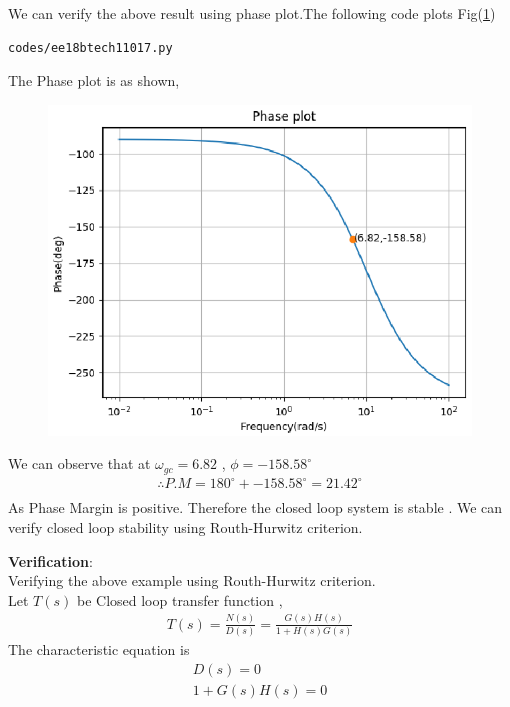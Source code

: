 \begin{enumerate}[label=\thesection.\arabic*.,ref=\thesection.\theenumi]
We can verify the above result using phase plot.The following code plots Fig(\ref{fig:ee18btech11017_2})
\begin{lstlisting}
codes/ee18btech11017.py
\end{lstlisting}
The Phase plot is as shown,
\begin{figure}[!h]
  \includegraphics[width=\columnwidth]{./figures/ee18btech11017_2.eps}
  \caption{}
  \label{fig:ee18btech11017_2}
\end{figure}

We can observe that at $\omega_{gc}=6.82$ , $\phi=-158.58^{\circ}$
\\
\begin{align}
\therefore P.M=180^{\circ}+-158.58^{\circ}=21.42^{\circ} \\
\end{align}
As Phase Margin is positive. Therefore the closed loop system is stable .
We can verify closed loop stability using Routh-Hurwitz criterion.

\textbf{Verification}: \\

Verifying the above example using Routh-Hurwitz criterion.\\
Let $T(s)$ be Closed loop transfer function ,
\begin{align}
T(s)=\frac{N(s)}{D(s)}=\frac{G(s)H(s)}{1+H(s)G(s)}
\end{align}
The characteristic equation is 
\begin{align}
D(s)=0  \\
1+G(s)H(s)=0 
\end{align}


\end{enumerate}

